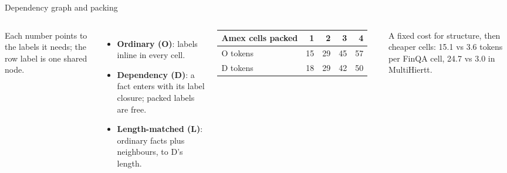 \documentclass[aspectratio=169,11pt]{beamer}
\begin{document}
\begin{frame}{Dependency graph and packing}
\begin{columns}[c]
\centering
{}\par\vspace{.3em}
{\scriptsize\color{muted}Each number points to the labels it needs; the row label is one shared node.}
\footnotesize
\begin{itemize}\itemsep3pt
\item \textcolor{ordblue}{\textbf{Ordinary (O)}}: labels inline in every cell.
\item \textcolor{deporange}{\textbf{Dependency (D)}}: a fact enters with its label closure; packed labels are free.
\item \textcolor{lenaqua}{\textbf{Length-matched (L)}}: ordinary facts plus neighbours, to D's length.
\end{itemize}
\vspace{.4em}
\setlength{\tabcolsep}{5pt}
\begin{tabular}{@{}lrrrr@{}}
Amex cells packed & 1 & 2 & 3 & 4\\\midrule
\textcolor{ordblue}{O tokens} & 15 & 29 & 45 & 57\\
\textcolor{deporange}{D tokens} & 18 & 29 & 42 & 50\\
\end{tabular}\par\vspace{.2em}
{\scriptsize A fixed cost for structure, then cheaper cells: 15.1 vs 3.6 tokens per FinQA cell, 24.7 vs 3.0 in MultiHiertt.}
\end{columns}
\end{frame}
\end{document}
